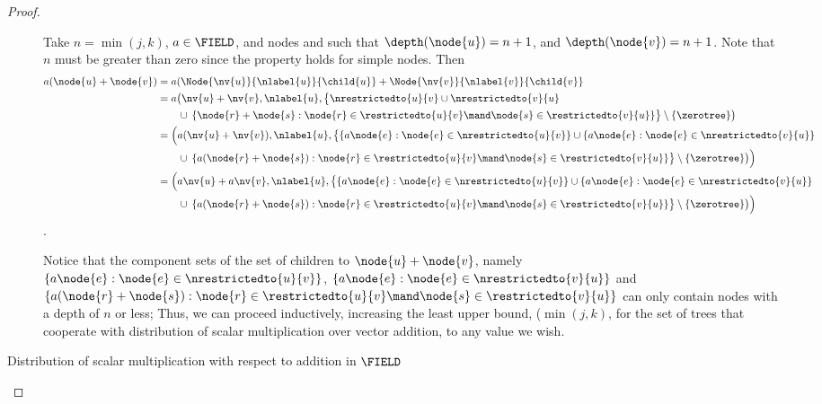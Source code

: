 \begin{proposition}
\begin{proof}
\begin{description}
      Take \(n = \min(j, k)\), \(a\in\FIELD\), and nodes  and  such that
      \(\depth(\node{u}) = n+1\), and \(\depth(\node{v}) = n+1\).
      Note that \(n\) must be greater than zero since the property holds for simple
      nodes.  Then
      \begin{align*}
        a(\node{u} + \node{v}) &= a (\Node{\nv{u}}{\nlabel{u}}{\child{u}} + \Node{\nv{v}}{\nlabel{v}}{\child{v}}\\ 
        &= a \bigl(\nv{u} + \nv{v}, \nlabel{u}, \bigl\{\nrestrictedto{u}{v} \cup \nrestrictedto{v}{u} \\
        &\qquad \cup \hspace{2pt} \{\node{r} + \node{s}:  \node{r} \in \restrictedto{u}{v}\mand \node{s} \in \restrictedto{v}{u} \} \bigr\} \setminus \{\zerotree\} \bigr) \\
        &= \Bigl(a (\nv{u} + \nv{v}), \nlabel{u}, 
        \bigl\{\{a \node{e}: \node{e} \in \nrestrictedto{u}{v}\} \cup \{a \node{e}: \node{e} \in \nrestrictedto{v}{u}\} \\
        &\qquad \cup \hspace{2pt} \{a (\node{r} + \node{s}):  \node{r} \in \restrictedto{u}{v}\mand \node{s} \in \restrictedto{v}{u} \} \bigr\} \setminus \{\zerotree\} \bigr)\Bigr) \\
        &= \Bigl(a \nv{u} + a \nv{v}, \nlabel{u},  
        \bigl\{\{a \node{e}: \node{e} \in \nrestrictedto{u}{v}\} \cup \{a \node{e}: \node{e} \in \nrestrictedto{v}{u}\} \\
        &\qquad \cup \hspace{2pt} \{a (\node{r} + \node{s}):  \node{r} \in \restrictedto{u}{v}\mand \node{s} \in \restrictedto{v}{u} \} \bigr\} \setminus \{\zerotree\} \bigr)\Bigr)
      \end{align*}.

      Notice that the component sets of the set of children to \(\node{u} +
      \node{v}\), namely \(\{a \node{e}: \node{e} \in
      \nrestrictedto{u}{v}\}\),  
      \(\{a \node{e}: \node{e} \in
      \nrestrictedto{v}{u}\}\) and \(\{a (\node{r} + \node{s}):
      \node{r} \in \restrictedto{u}{v}\mand \node{s} \in
      \restrictedto{v}{u} \}\) can only contain nodes with a depth of
      \(n\) or less; Thus, we can proceed inductively, increasing
      the least upper bound, (\(\min(j, k)\), for the set of trees
      that cooperate with distribution of scalar multiplication over
      vector addition, to any value we wish.

    \item[Distribution of scalar multiplication with respect to
      addition in $\FIELD$ ]


\end{description}
\end{proof}
\end{proposition}
